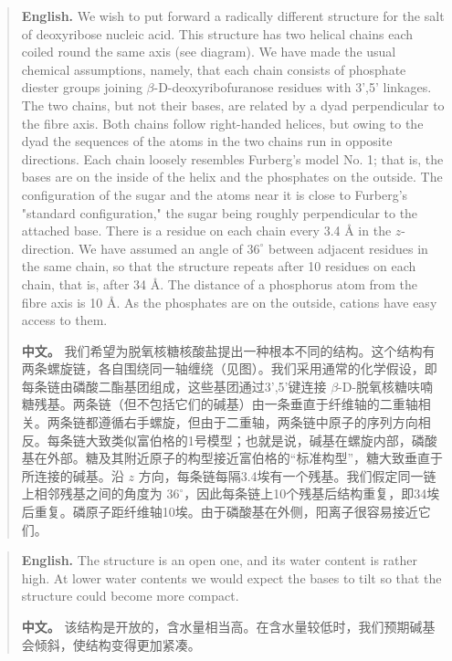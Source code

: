 \begin{quote}
\noindent\textbf{English.} We wish to put forward a radically different structure for the salt of deoxyribose nucleic acid. This structure has two helical chains each coiled round the same axis (see diagram). We have made the usual chemical assumptions, namely, that each chain consists of phosphate diester groups joining \(\beta\)-D-deoxyribofuranose residues with 3',5' linkages. The two chains, but not their bases, are related by a dyad perpendicular to the fibre axis. Both chains follow right-handed helices, but owing to the dyad the sequences of the atoms in the two chains run in opposite directions. Each chain loosely resembles Furberg's model No. 1; that is, the bases are on the inside of the helix and the phosphates on the outside. The configuration of the sugar and the atoms near it is close to Furberg's "standard configuration," the sugar being roughly perpendicular to the attached base. There is a residue on each chain every 3.4 \AA{} in the \(z\)-direction. We have assumed an angle of \(36^\circ\) between adjacent residues in the same chain, so that the structure repeats after 10 residues on each chain, that is, after 34 \AA{}. The distance of a phosphorus atom from the fibre axis is 10 \AA{}. As the phosphates are on the outside, cations have easy access to them.

\smallskip
\noindent\textbf{中文。} 我们希望为脱氧核糖核酸盐提出一种根本不同的结构。这个结构有两条螺旋链，各自围绕同一轴缠绕（见图）。我们采用通常的化学假设，即每条链由磷酸二酯基团组成，这些基团通过3',5'键连接 \(\beta\)-D-脱氧核糖呋喃糖残基。两条链（但不包括它们的碱基）由一条垂直于纤维轴的二重轴相关。两条链都遵循右手螺旋，但由于二重轴，两条链中原子的序列方向相反。每条链大致类似富伯格的1号模型；也就是说，碱基在螺旋内部，磷酸基在外部。糖及其附近原子的构型接近富伯格的“标准构型”，糖大致垂直于所连接的碱基。沿 \(z\) 方向，每条链每隔3.4埃有一个残基。我们假定同一链上相邻残基之间的角度为 \(36^\circ\)，因此每条链上10个残基后结构重复，即34埃后重复。磷原子距纤维轴10埃。由于磷酸基在外侧，阳离子很容易接近它们。
\end{quote}

\begin{quote}
\noindent\textbf{English.} The structure is an open one, and its water content is rather high. At lower water contents we would expect the bases to tilt so that the structure could become more compact.

\smallskip
\noindent\textbf{中文。} 该结构是开放的，含水量相当高。在含水量较低时，我们预期碱基会倾斜，使结构变得更加紧凑。
\end{quote}

